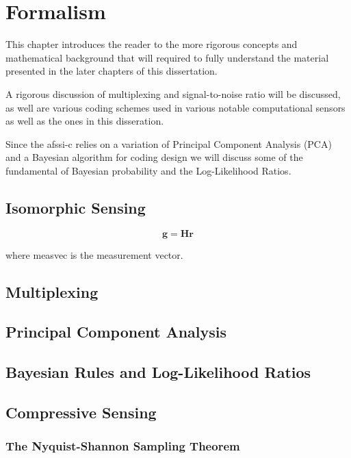 \chapter{Formalism}\label{chap:Formalism}

This chapter introduces the reader to the more rigorous concepts and mathematical background that will required to fully understand the material presented in the later chapters of this dissertation. 

A rigorous discussion of multiplexing and signal-to-noise ratio will be discussed, as well are various coding schemes used in various notable computational sensors as well as the ones in this disseration. 

Since the \gls{afssi-c} relies on a variation of Principal Component Analysis (PCA) and a Bayesian algorithm for coding design we will discuss some of the fundamental of Bayesian probability and the Log-Likelihood Ratios. 


\section{Isomorphic Sensing}

\begin{equation}
\mathbf{g} = \mathbf{Hr}
\end{equation}

where \gls{measvec} is the measurement vector.

\section{Multiplexing}

\section{Principal Component Analysis}

\section{Bayesian Rules and Log-Likelihood Ratios}

\section{Compressive Sensing}

\subsection{The Nyquist-Shannon Sampling Theorem}

